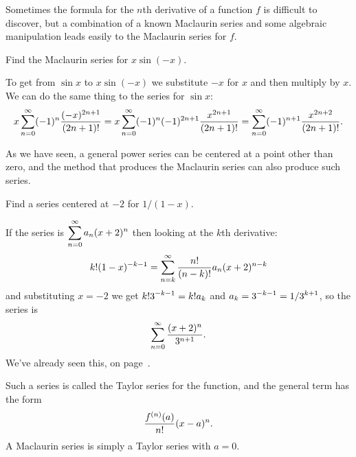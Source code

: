 Sometimes the formula for the $n$th derivative of a function $f$ is
difficult to discover, but a combination of a known Maclaurin series
and some algebraic manipulation leads easily to the Maclaurin series
for $f$.

\begin{example} Find the Maclaurin series for $x\sin(-x)$.

To get from $\sin x$ to $x\sin(-x)$ we substitute $-x$ for $x$ and
then multiply by $x$. We can do the same thing to the series for $\sin
x$:
$$
  x\sum_{n=0}^\infty (-1)^n{(-x)^{2n+1}\over (2n+1)!}
  =x\sum_{n=0}^\infty (-1)^{n}(-1)^{2n+1}{x^{2n+1}\over (2n+1)!}
  =\sum_{n=0}^\infty (-1)^{n+1}{x^{2n+2}\over (2n+1)!}.
$$
\end{example}

As we have seen, a general power series can be centered at a point
other than zero, and the method that produces the Maclaurin series can
also produce such series.

\begin{example} Find a series centered at $-2$ for $1/(1-x)$.

If the series is $\displaystyle\sum_{n=0}^\infty a_n(x+2)^n$ then looking at the
$k$th derivative:
$$k!(1-x)^{-k-1}=\sum_{n=k}^\infty {n!\over (n-k)!}a_n(x+2)^{n-k}$$
and substituting $x=-2$ we get
$\displaystyle k!3^{-k-1}=k!a_k$ and $\displaystyle a_k=3^{-k-1}=1/3^{k+1}$, so the series is
$$\sum_{n=0}^\infty {(x+2)^n\over 3^{n+1}}.$$
We've already seen this, on page~.
\end{example}

Such a series is called the 
{\dfont Taylor series\/} 
for the function,
and the general term has the form
$${f^{(n)}(a)\over n!}(x-a)^n.$$
A Maclaurin series is simply a Taylor series with $a=0$.

